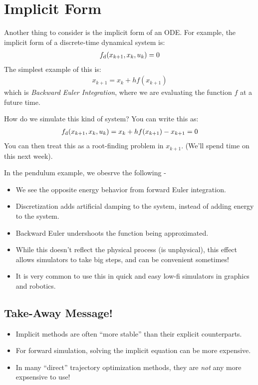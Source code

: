 \section{Implicit Form}
Another thing to consider is the implicit form of an ODE. For example, the implicit form of a discrete-time dynamical system is:
\begin{align}
    f_{\rm d} (x_{k+1}, x_{k}, u_k) = 0
\end{align}
The simplest example of this is:
\begin{align}
    x_{k+1} = x_{k} + h f(x_{k+1})
\end{align}
which is \textit{Backward Euler Integration}, where we are evaluating the function $f$ at a future time.

\noindent
How do we simulate this kind of system?
You can write this as:
\begin{align}
    f_{\rm d} (x_{k+1}, x_k, u_k) = x_k + h f(x_{k+1}) - x_{k+1} = 0
\end{align}
You can then treat this as a root-finding problem in $x_{k+1}$. (We'll spend time on this next week).

\noindent
In the pendulum example, we obesrve the following -
\begin{itemize}
    \item We see the opposite energy behavior from forward Euler integration.
    \item Discretization adds artificial damping to the system, instead of adding energy to the system.
    \item Backward Euler undershoots the function being approximated.
    \item While this doesn't reflect the physical process (is unphysical), this effect allows simulators to take big steps, and can be convenient sometimes!
    \item It is very common to use this in quick and easy low-fi simulators in graphics and robotics.
\end{itemize}

\subsection{Take-Away Message!}
\begin{itemize}
    \item Implicit methods are often ``more stable'' than their explicit counterparts.
    \item For forward simulation, solving the implicit equation can be more expensive.
    \item In many ``direct'' trajectory optimization methods, they are \textit{not} any more expsensive to use!
\end{itemize}

